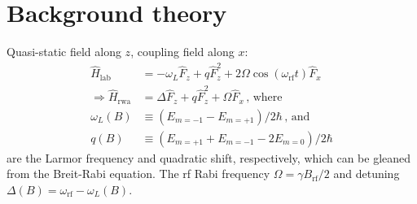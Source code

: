 \documentclass[aps,prl,reprint,superscriptaddress,floatfix]{revtex4-1}
\begin{document}
\section{Background theory}
\label{sec:background}
Quasi-static field along $z$, coupling field along $x$:
\begin{align*}
    \hat{H}_{\text{lab}} &= -\omega_L \hat{F}_z + q \hat{F}_z^2 + 2\Omega \cos (\omega_{\text{rf}} t) \hat{F}_x \\
    \Rightarrow \hat{H}_{\text{rwa}} &= \Delta \hat{F}_z + q \hat{F}_z^2 + \Omega \hat{F}_x \, \text{, where} \\
    \omega_L(B) &\equiv (E_{m=-1} - E_{m=+1})/2\hbar \, \text{, and} \\
    q(B) &\equiv (E_{m=+1} + E_{m=-1} - 2 E_{m=0})/2\hbar
\end{align*}
are the Larmor frequency and quadratic shift, respectively, which can be gleaned from the Breit-Rabi equation.
The rf Rabi frequency $\Omega = \gamma B_{\text{rf}}/2$ and detuning $\Delta(B) = \omega_{\text{rf}} - \omega_L(B)$.
\end{document}
